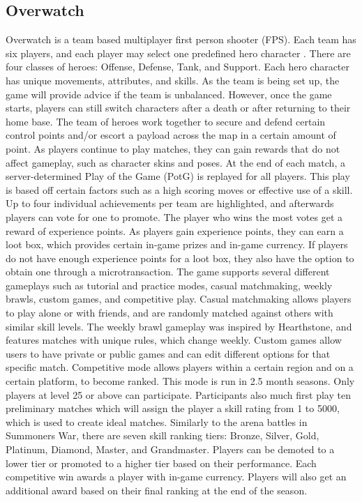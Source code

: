 \subsection{Overwatch}
Overwatch is a team based multiplayer first person shooter (FPS). Each team has six players, and each player may select one predefined hero character \cite{Overwatch}. There are four classes of heroes: Offense, Defense, Tank, and Support. Each hero character has unique movements, attributes, and skills. As the team is being set up, the game will provide advice if the team is unbalanced. However, once the game starts, players can still switch characters after a death or after returning to their home base. The team of heroes work together to secure and defend certain control points and/or escort a payload across the map in a certain amount of point. As players continue to play matches, they can gain rewards that do not affect gameplay, such as character skins and poses. At the end of each match, a server-determined Play of the Game (PotG) is replayed for all players. This play is based off certain factors such as a high scoring moves or effective use of a skill. Up to four individual achievements per team are highlighted, and afterwards players can vote for one to promote. The player who wins the most votes get a reward of experience points. 
	As players gain experience points, they can earn a loot box, which provides certain in-game prizes and in-game currency. If players do not have enough experience points for a loot box, they also have the option to obtain one through a microtransaction. 
	The game supports several different gameplays such as tutorial and practice modes, casual matchmaking, weekly brawls, custom games, and competitive play. Casual matchmaking allows players to play alone or with friends, and are randomly matched against others with similar skill levels. The weekly brawl gameplay was inspired by Hearthstone, and features matches with unique rules, which change weekly. Custom games allow users to have private or public games and can edit different options for that specific match. Competitive mode allows players within a certain region and on a certain platform, to become ranked. This mode is run in 2.5 month seasons. Only players at level 25 or above can participate. Participants also much first play ten preliminary matches which will assign the player a skill rating from 1 to 5000, which is used to create ideal matches. Similarly to the arena battles in Summoners War, there are seven skill ranking tiers: Bronze, Silver, Gold, Platinum, Diamond, Master, and Grandmaster. Players can be demoted to a lower tier or promoted to a higher tier based on their performance. Each competitive win awards a player with in-game currency. Players will also get an additional award based on their final ranking at the end of the season. 
	
